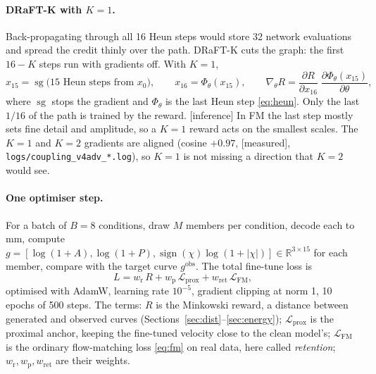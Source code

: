 \documentclass[11pt,a4paper]{article}
\newcommand{\R}{\mathbb{R}}
\newcommand{\sg}{\operatorname{sg}}
\newcommand{\status}[1]{\textsf{\small[#1]}}
\begin{document}
\paragraph{DRaFT-K with $K=1$.} Back-propagating through all 16 Heun steps would store 32 network evaluations and spread
the credit thinly over the path. DRaFT-K cuts the graph: the first $16-K$ steps run with gradients off. With $K = 1$,
\begin{equation}
  x_{15} = \sg\big(\text{15 Heun steps from } x_0\big),\qquad x_{16} = \Phi_\theta(x_{15}),\qquad
  \nabla_\theta R = \frac{\partial R}{\partial x_{16}}\;\frac{\partial \Phi_\theta(x_{15})}{\partial\theta},
\end{equation}
where $\sg$ stops the gradient and $\Phi_\theta$ is the last Heun step \eqref{eq:heun}. Only the last $1/16$ of the
path is trained by the reward. \status{inference} In FM the last step mostly sets fine detail and amplitude, so a
$K=1$ reward acts on the smallest scales. The $K=1$ and $K=2$ gradients are aligned (cosine $+0.97$, \status{measured},
\texttt{logs/coupling\_v4adv\_*.log}), so $K=1$ is not missing a direction that $K=2$ would see.

\paragraph{One optimiser step.} For a batch of $B = 8$ conditions, draw $M$ members per condition, decode each to mm,
compute $g = [\log(1+A), \log(1+P), \operatorname{sign}(\chi)\log(1+|\chi|)]\in\R^{3\times15}$ for each member,
compare with the target curve $g^{\mathrm{obs}}$. The total fine-tune loss is
\begin{equation}\label{eq:total}
  L = w_{\mathrm r}\,R + w_{\mathrm p}\,\mathcal L_{\mathrm{prox}} + w_{\mathrm{ret}}\,\mathcal L_{\mathrm{FM}},
\end{equation}
optimised with AdamW, learning rate $10^{-5}$, gradient clipping at norm 1, 10 epochs of 500 steps. The terms:
$R$ is the Minkowski reward, a distance between generated and observed curves (Sections~\ref{sec:dist}--\ref{sec:energy});
$\mathcal L_{\mathrm{prox}}$ is the proximal anchor, keeping the fine-tuned velocity close to the clean model's;
$\mathcal L_{\mathrm{FM}}$ is the ordinary flow-matching loss \eqref{eq:fm} on real data, here called \emph{retention};
$w_{\mathrm r}, w_{\mathrm p}, w_{\mathrm{ret}}$ are their weights.
\end{document}

